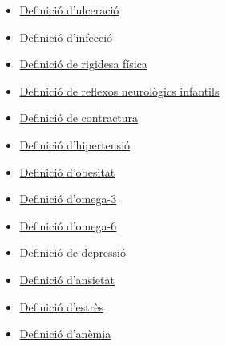\documentclass[a4paper,12pt]{article}
\begin{document}
\begin{itemize}
    \item \href{https://www.cancer.gov/espanol/publicaciones/diccionarios/diccionario-cancer/def/ulceracion}{\underline{Definició d'ulceració}}
    \item \href{https://policlinicametropolitana.org/informacion-de-salud/infecciones-tipo-sintomas-prevencion/}{\underline{Definició d'infecció}}
    \item \href{https://www.fisioterapia-online.com/glosario/rigidez#:~:text=Definici%C3%B3n%20%2D%20Qu%C3%A9%20es%20rigidez&text=En%20el%20%C3%A1rea%20de%20la,dificultad%20para%20movilizar%20las%20articulaciones.}{\underline{Definició de rigidesa física}}
    \item \href{https://www.elsevier.es/es-revista-neurologia-argentina-301-articulo-reflejos-patologicos-S1853002818300429#:~:text=El%20reflejo%20se%20define%20como,pudiendo%20ser%20o%20no%20consciente.}{\underline{Definició de reflexos neurològics infantils}}
    \item \href{https://www.topdoctors.es/diccionario-medico/contractura-muscular}{\underline{Definició de contractura}}
    \item \href{https://www.who.int/es/news-room/fact-sheets/detail/hypertension#:~:text=Se%20habla%20de%20hipertensi%C3%B3n%20cuando,es%20tomarse%20la%20tensi%C3%B3n%20arterial.}{\underline{Definició d'hipertensió}}
    \item \href{https://mutuaterrassa.com/blogs/es/endocrinologia/obesitat}{\underline{Definició d'obesitat}}
    \item \href{https://medlineplus.gov/spanish/ency/patientinstructions/000767.htm}{\underline{Definició d'omega-3}}
    \item \href{https://medlineplus.gov/spanish/druginfo/natural/496.html}{\underline{Definició d'omega-6}}
    \item \href{https://www.cun.es/enfermedades-tratamientos/enfermedades/depresion}{\underline{Definició de depressió}}
    \item \href{https://medlineplus.gov/spanish/anxiety.html#:~:text=¿Qué%20es%20la%20ansiedad%3F,una%20reacción%20normal%20al%20estrés.}{\underline{Definició d'ansietat}}
    \item \href{https://medlineplus.gov/spanish/ency/article/003211.htm#:~:text=El%20estrés%20es%20un%20sentimiento,a%20un%20desafío%20o%20demanda.}{\underline{Definició d'estrès}}
    \item \href{https://www.nhlbi.nih.gov/es/salud/anemia#:~:text=La%20anemia%20es%20una%20afección,se%20sienta%20cansado%20o%20débil.}{\underline{Definició d'anèmia}}

\end{itemize}
\end{document}
